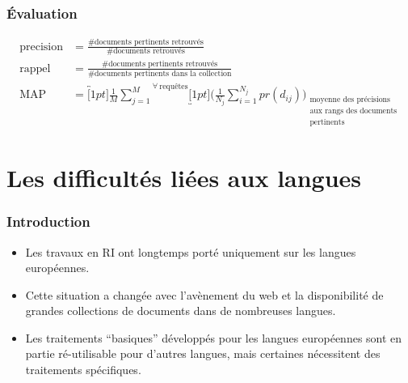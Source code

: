 \documentclass[12pt,aspectratio=43,dvipsnames,table]{beamer}
\begin{document}
\begin{frame}
    \frametitle{\'Evaluation}

    \begin{align*}
    \text{precision} & = \frac{\text{\# documents pertinents retrouvés}}
                              {\text{\# documents retrouvés}}
                              \\[1.5em]
    \text{rappel} & = \frac{\text{\# documents pertinents retrouvés}}
                           {\text{\# documents pertinents dans la collection}}
                           \\[1.5em]
    \text{MAP} & = \overbracket[1pt]{
                      \frac{1}{M} \sum_{j=1}^{M}
                   }^{\forall~\text{requêtes}} 
                   \underbracket[1pt]{
                    \Bigg( \frac{1}{N_j} \sum_{i=1}^{N_j} pr(d_{ij}) \Bigg)
                   }_{
                      \substack{
                        \text{moyenne des précisions} \\ 
                        \text{aux rangs des documents} \\ 
                        \text{pertinents}
                      }
                    }
    \end{align*}

\end{frame}


\section{Les difficultés liées aux langues}


\begin{frame}
    \frametitle{Introduction}
    \begin{itemize} \itemsep10pt
      \item Les travaux en RI ont longtemps porté uniquement sur les langues 
            européennes.
      \item Cette situation a changée avec l'avènement du web et la 
            disponibilité de grandes collections de documents dans de nombreuses 
            langues.
      \item Les traitements ``basiques'' développés pour les langues 
            européennes sont en partie ré-utilisable pour d'autres langues, 
            mais certaines nécessitent des traitements spécifiques.
    \end{itemize}
\end{frame}
\end{document}
